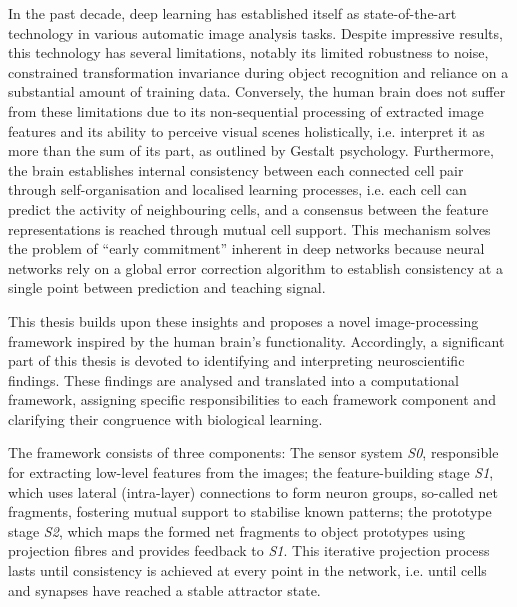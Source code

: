 In the past decade, deep learning has established itself as state-of-the-art technology in various automatic image analysis tasks.
Despite impressive results, this technology has several limitations, notably its limited robustness to noise, constrained transformation invariance during object recognition and reliance on a substantial amount of training data.
Conversely, the human brain does not suffer from these limitations due to its non-sequential processing of extracted image features and its ability to perceive visual scenes holistically, i.e. interpret it as more than the sum of its part, as outlined by Gestalt psychology.
Furthermore, the brain establishes internal consistency between each connected cell pair through self-organisation and localised learning processes, i.e. each cell can predict the activity of neighbouring cells, and a consensus between the feature representations is reached through mutual cell support. This mechanism solves the problem of ``early commitment'' inherent in deep networks because neural networks rely on a global error correction algorithm to establish consistency at a single point between prediction and teaching signal.

This thesis builds upon these insights and proposes a novel image-processing framework inspired by the human brain's functionality.
Accordingly, a significant part of this thesis is devoted to identifying and interpreting neuroscientific findings.
These findings are analysed and translated into a computational framework, assigning specific responsibilities to each framework component and clarifying their congruence with biological learning.

The framework consists of three components: The sensor system \emph{S0},  responsible for extracting low-level features from the images; the feature-building stage \emph{S1}, which uses lateral (intra-layer) connections to form neuron groups, so-called net fragments,  fostering mutual support to stabilise known patterns; the prototype stage \emph{S2}, which maps the formed net fragments to object prototypes using projection fibres and provides feedback to \emph{S1}.
This iterative projection process lasts until consistency is achieved at every point in the network, i.e. until cells and synapses have reached a stable attractor state.

